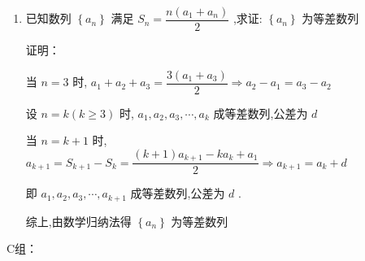 \begin{enumerate}
    \item 已知数列 $\left\{  {a}_{n}\right\}$ 满足 ${S}_{n} = \dfrac{n\left( {{a}_{1} + {a}_{n}}\right) }{2}$ ,求证: $\left\{  {a}_{n}\right\}$ 为等差数列
    \begin{jieda}
        证明：
        
        当 $n = 3$ 时, ${a}_{1} + {a}_{2} + {a}_{3} = \dfrac{3\left( {{a}_{1} + {a}_{3}}\right) }{2} \Longrightarrow  {a}_{2} - {a}_{1} = {a}_{3} - {a}_{2}$
        
        设 $n = k\left( {k \geq  3}\right)$ 时, ${a}_{1},{a}_{2},{a}_{3},\cdots ,{a}_{k}$ 成等差数列,公差为 $d$
        
        当 $n = k + 1$ 时, ${a}_{k + 1} = {S}_{k + 1} - {S}_{k} = \dfrac{\left( {k + 1}\right) {a}_{k + 1} - k{a}_{k} + {a}_{1}}{2} \Longrightarrow  {a}_{k + 1} = {a}_{k} + d$
        
        即 ${a}_{1},{a}_{2},{a}_{3},\cdots ,{a}_{k + 1}$ 成等差数列,公差为 $d$ .
        
        综上,由数学归纳法得 $\left\{  {a}_{n}\right\}$ 为等差数列
    \end{jieda}
\end{enumerate}
C组：

